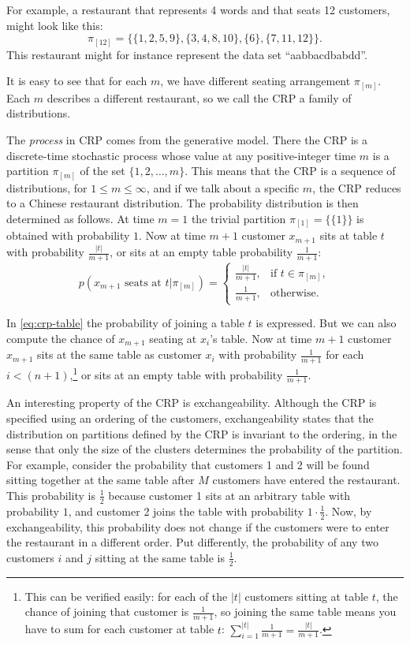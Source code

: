 For example, a restaurant that represents 4 words and that seats 12 customers, might look like this: 
\begin{equation}\label{eq:partitionexample}
	\pi_{[12]} = \{\{1,2,5,9\},\{3,4,8,10\},\{6\},\{7,11,12\}\}.
\end{equation}
This restaurant might for instance represent the data set ``aabbacdbabdd''. 

It is easy to see that for each $m$, we have different seating arrangement $\pi_{[m]}$. Each $m$ describes a different restaurant, so we call the CRP a family of distributions.

The \emph{process} in CRP comes from the generative model. There the CRP is a discrete-time stochastic process whose value at any positive-integer time $m$ is a partition $\pi_{[m]}$ of the set $\{1,2,\ldots,m\}$. This means that the CRP is a sequence of distributions, for $1\leq m \leq\infty$, and if we talk about a specific $m$, the CRP reduces to a Chinese restaurant distribution. The probability distribution is then determined as follows. At time $m=1$ the trivial partition $\pi_{[1]}=\{\{1\}\}$ is obtained with probability $1$. 
Now at time $m+1$ customer $x_{m+1}$ sits at table $t$ with probability $\frac{|t|}{m+1}$, or sits at an empty table probability $\frac{1}{m+1}$: 
\begin{equation}\label{eq:crp-table}
	p(x_{m+1}\text{ seats at }t|\pi_{[m]}) = 
    \begin{cases}
    	\frac{|t|}{m+1}, & \text{if }t\in\pi_{[m]},\\
    	\frac{1}{m+1}, & \text{otherwise}.
  	\end{cases}
\end{equation}

In \cref{eq:crp-table} the probability of joining a table $t$ is expressed. But we can also compute the chance of $x_{m+1}$ seating at $x_i$'s table. Now at time $m+1$ customer $x_{m+1}$ sits at the same table as customer $x_i$ with probability $\frac{1}{m+1}$ for each $i<(n+1)$,\footnote{This can be verified easily: for each of the $|t|$ customers sitting at table $t$, the chance of joining that customer is $\frac{1}{m+1}$, so joining the same table means you have to sum for each customer at table $t$: $\sum_{i=1}^{|t|} \frac{1}{m+1} = \frac{|t|}{m+1}$.} or sits at an empty table with probability $\frac{1}{m+1}$. 

An interesting property of the CRP is exchangeability. Although the CRP is specified using an ordering of the customers, exchangeability states that the distribution on partitions defined by the CRP is invariant to the ordering, in the sense that only the size of the clusters determines the probability of the partition. For example, consider the probability that customers 1 and 2 will be found sitting together at the same table after $M$ customers have entered the restaurant. This probability is $\frac{1}{2}$ because customer 1 sits at an arbitrary table with probability $1$, and customer 2 joins the table with probability $1\cdot\frac{1}{2}$. Now, by exchangeability, this probability does not change if the customers were to enter the restaurant in a different order. Put differently, the probability of any two customers $i$ and $j$ sitting at the same table is $\frac{1}{2}$.

